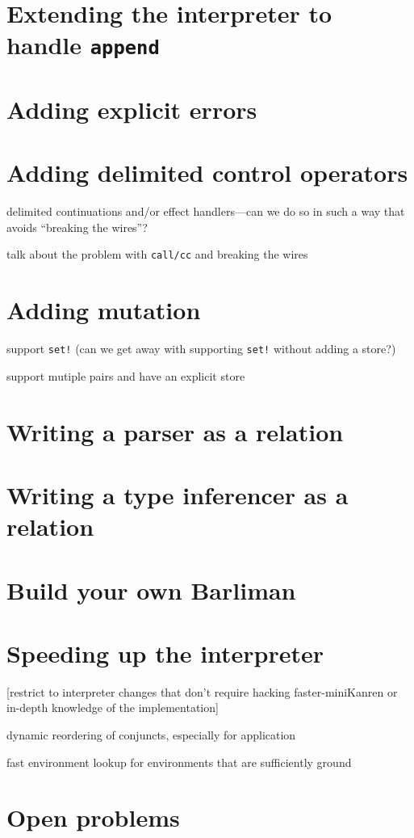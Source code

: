 \documentclass{book}
\begin{document}
\chapter{Extending the interpreter to handle \texttt{append}}%


\chapter{Adding explicit errors}%


\chapter{Adding delimited control operators}%

delimited continuations and/or effect handlers---can we do so in such a way that avoids ``breaking the wires''?

talk about the problem with \verb|call/cc| and breaking the wires


\chapter{Adding mutation}%

support \verb|set!| (can we get away with supporting \verb|set!| without adding a store?)

support mutiple pairs and have an explicit store


\chapter{Writing a parser as a relation}%


\chapter{Writing a type inferencer as a relation}%


\chapter{Build your own Barliman}%


\chapter{Speeding up the interpreter}%

[restrict to interpreter changes that don't require hacking faster-miniKanren or in-depth knowledge of the implementation]

dynamic reordering of conjuncts, especially for application

fast environment lookup for environments that are sufficiently ground


\chapter{Open problems}%


\appendix
\end{document}
